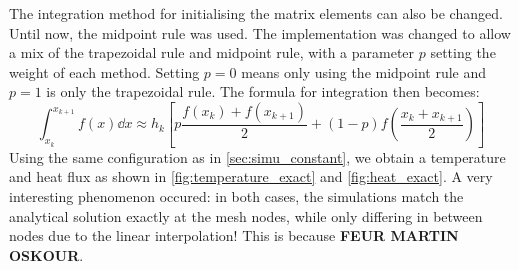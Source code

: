 The integration method for initialising the matrix elements can also be changed. Until now, the midpoint rule was used. The implementation was changed to allow a mix of the trapezoidal rule and midpoint rule, with a parameter \(p\) setting the weight of each method. Setting \(p = 0\) means only using the midpoint rule and \(p = 1\) is only the trapezoidal rule. The formula for integration then becomes:
\begin{equation}
    \int_{x_k}^{x_{k+1}} f(x) \dd x \approx h_k \left[ p \frac{f(x_k) + f(x_{k+1})}{2} + (1-p) f \left( \frac{x_k + x_{k+1}}{2} \right) \right]
\end{equation}
Using the same configuration as in \autoref{sec:simu_constant}, we obtain a temperature and heat flux as shown in \autoref{fig:temperature_exact} and \autoref{fig:heat_exact}. A very interesting phenomenon occured: in both cases, the simulations match the analytical solution exactly at the mesh nodes, while only differing in between nodes due to the linear interpolation! This is because \textbf{FEUR MARTIN OSKOUR}.

